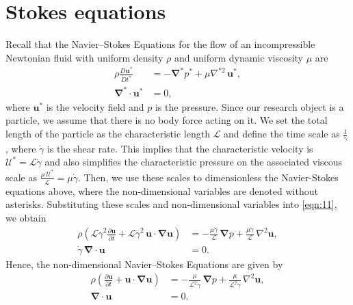 \documentclass[12pt,MSc,twoside]{muthesis_2020}
\begin{document}
\section{Stokes equations}
Recall that the Navier–Stokes Equations for the flow of an incompressible Newtonian fluid with uniform density $\rho$ and uniform dynamic viscosity $\mu$ are 
\begin{equation}
\label{eqn:11}
\begin{aligned}
        \rho\frac{D\mathbf{u}^*}{Dt^*}&=-\bm{\nabla}^*p^*+\mu \nabla^{*2}\,\mathbf{u}^*,\\
        \bm{\nabla}^*\cdot \mathbf{u}^*&= 0,
\end{aligned}
\end{equation}
where $\mathbf{u}^*$ is the velocity field and $p$ is the pressure. Since our research object is a particle, we assume that there is no body force acting on it. We set the total length of the particle as the characteristic length $\mathcal{L}$ and define the time scale as $\frac{1}{\dot{\gamma}}$, where $\dot{\gamma}$ is the shear rate. This implies that the characteristic velocity is $\mathcal{U^*}=\mathcal{L}\dot{\gamma}$ and also simplifies the characteristic pressure on the associated viscous scale as $\frac{\mu \,\mathcal{U^*}}{\mathcal{L}}=\mu\dot{\gamma}$. Then, we use these scales to dimensionless the Navier-Stokes equations above, where the non-dimensional variables are denoted without asterisks. Substituting these scales and non-dimensional variables into \eqref{eqn:11}, we obtain 
\begin{equation}
\label{eqn:12}
\begin{aligned}
\rho\left(\mathcal{L}\dot{\gamma}^2\frac{\partial\mathbf{u}}{\partial t}+\mathcal{L}\dot{\gamma}^2\,\mathbf{u}\cdot\bm{\nabla}\mathbf{u} \right)&=-\frac{\mu\dot{\gamma}}{\mathcal{L}}\,\bm{\nabla} p+\frac{\mu\dot{\gamma}}{\mathcal{L}}\,\nabla^{2}\mathbf{u},\\
\dot{\gamma}\,\bm{\nabla}\cdot\mathbf{u}&=0.
\end{aligned}
\end{equation}
Hence, the non-dimensional Navier–Stokes Equations are given by
\begin{equation}
\label{eqn:13}
\begin{aligned}
\rho\left(\frac{\partial\mathbf{u}}{\partial t}+\mathbf{u}\cdot\bm{\nabla}\mathbf{u} \right)&=-\frac{\mu}{\mathcal{L}^2\dot{\gamma}}\,\bm{\nabla} p+\frac{\mu}{\mathcal{L}^2\dot{\gamma}}\,\nabla^{2}\mathbf{u},\\
\bm{\nabla}\cdot\mathbf{u}&=0.
\end{aligned}
\end{equation}
\end{document}
